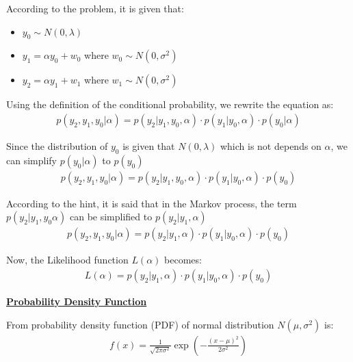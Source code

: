 \documentclass[12pt, a4paper]{article}
\begin{document}
            \noindent According to the problem, it is given that:
            \begin{itemize}
                \item $y_{0} \sim N(0, \lambda)$
                \item $y_{1} = \alpha y_{0} + w_{0}$ where $w_{0} \sim N(0, \sigma^{2})$
                \item $y_{2} = \alpha y_{1} + w_{1}$ where $w_{1} \sim N(0, \sigma^{2})$
            \end{itemize}

            Using the definition of the conditional probability, we rewrite the equation as:
            \begin{align*}
                p(y_{2}, y_{1}, y_{0}|\alpha) = p(y_{2}|y_{1}, y_{0}, \alpha) \cdot p(y_{1}|y_{0}, \alpha) \cdot p(y_{0}|\alpha)
            \end{align*}

            Since the distribution of $y_{0}$ is given that $N(0, \lambda)$ which is not depends on $\alpha$, we can simplify $p(y_{0}|\alpha)$ to $p(y_{0})$
            \begin{align*}
                p(y_{2}, y_{1}, y_{0}|\alpha) = p(y_{2}|y_{1}, y_{0}, \alpha) \cdot p(y_{1}|y_{0}, \alpha) \cdot p(y_{0})
            \end{align*}

            According to the hint, it is said that in the Markov process, the term $p(y_{2}|y_{1}, y_{0} \alpha)$ can be simplified to $p(y_{2}|y_{1}, \alpha)$
            \begin{align*}
                p(y_{2}, y_{1}, y_{0}|\alpha) = p(y_{2}|y_{1}, \alpha) \cdot p(y_{1}|y_{0}, \alpha) \cdot p(y_{0})
            \end{align*}

            Now, the Likelihood function $L(\alpha)$ becomes:
            \begin{align*}
                L(\alpha) = p(y_{2}|y_{1}, \alpha) \cdot p(y_{1}|y_{0}, \alpha) \cdot p(y_{0})
            \end{align*}

    \pagebreak

            \noindent\underline{\textbf{Probability Density Function}}

            \vspace{1em}

            From probability density function (PDF) of normal distribution $N(\mu, \sigma^{2})$ is:
            \begin{align*}
                f(x) = \frac{1}{\sqrt{2\pi\sigma^{2}}} \exp\left( -\frac{(x - \mu)^{2}}{2\sigma^{2}} \right)
            \end{align*}
\end{document}
